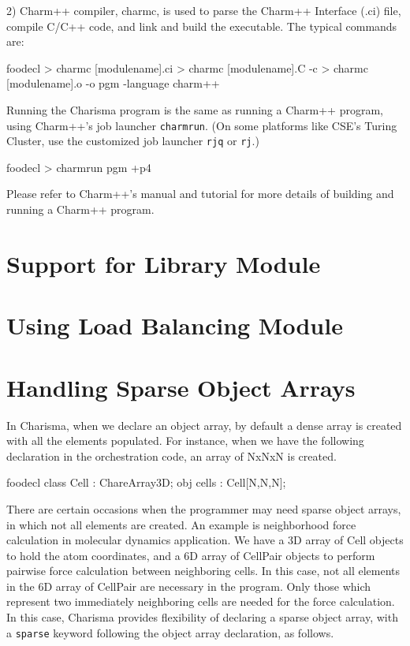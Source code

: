 \documentclass[10pt]{article}
\def\smallfbox#1{{\small {\fbox{#1}}}}
\def\code#1{{\small {\tt {#1}}}}
\begin{document}
2) Charm++ compiler, charmc, is used to parse the Charm++ Interface (.ci) file,
compile C/C++ code, and link and build the executable. The typical commands are:
\begin{SaveVerbatim}{foodecl}
    > charmc [modulename].ci
    > charmc [modulename].C -c
    > charmc [modulename].o -o pgm -language charm++
\end{SaveVerbatim}
\smallfbox{\BUseVerbatim{foodecl}}

Running the Charisma program is the same as running a Charm++ program, using
Charm++'s job launcher \code{charmrun}. (On some platforms like CSE's Turing 
Cluster, use the customized job launcher \code{rjq} or \code{rj}.) 

\begin{SaveVerbatim}{foodecl}
    > charmrun pgm +p4
\end{SaveVerbatim}
\smallfbox{\BUseVerbatim{foodecl}}

Please refer to Charm++'s manual and tutorial for more details of building 
and running a Charm++ program. 

\section{Support for Library Module}
\label{sec:module}


\section{Using Load Balancing Module}
\label{sec:ldb}


\section{Handling Sparse Object Arrays}
\label{sec:sparse}

In Charisma, when we declare an object array, by default a dense array is
created with all the elements populated. For instance, when we have the
following declaration in the orchestration code, an array of NxNxN is created. 
\begin{SaveVerbatim}{foodecl}
    class Cell : ChareArray3D;
    obj cells : Cell[N,N,N];
\end{SaveVerbatim}
\smallfbox{\BUseVerbatim{foodecl}}

There are certain occasions when the programmer may need sparse object arrays,
in which not all elements are created. An example is neighborhood force
calculation in molecular dynamics application. We have a 3D array of Cell
objects to hold the atom coordinates, and a 6D array of CellPair objects to
perform pairwise force calculation between neighboring cells. In this case, not
all elements in the 6D array of CellPair are necessary in the program. Only
those which represent two immediately neighboring cells are needed for the
force calculation. In this case, Charisma provides flexibility of declaring a
sparse object array, with a \code{sparse} keyword following the object array
declaration, as follows.
\end{document}
